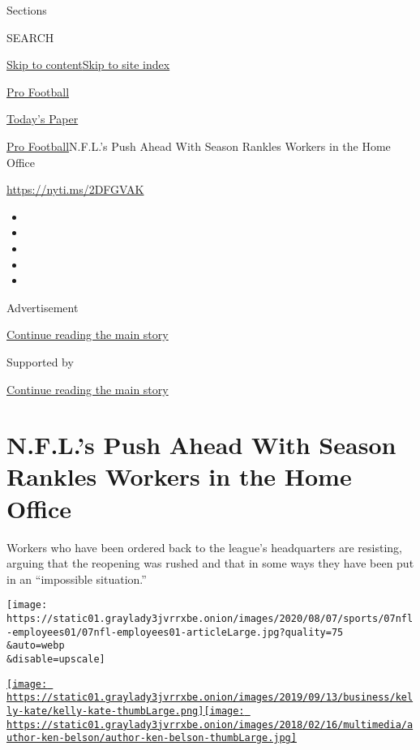 Sections

SEARCH

\protect\hyperlink{site-content}{Skip to
content}\protect\hyperlink{site-index}{Skip to site index}

\href{https://www.nytimes3xbfgragh.onion/section/sports/football}{Pro
Football}

\href{https://myaccount.nytimes3xbfgragh.onion/auth/login?response_type=cookie\&client_id=vi}{}

\href{https://www.nytimes3xbfgragh.onion/section/todayspaper}{Today's
Paper}

\href{/section/sports/football}{Pro Football}\textbar{}N.F.L.'s Push
Ahead With Season Rankles Workers in the Home Office

\url{https://nyti.ms/2DFGVAK}

\begin{itemize}
\item
\item
\item
\item
\item
\end{itemize}

Advertisement

\protect\hyperlink{after-top}{Continue reading the main story}

Supported by

\protect\hyperlink{after-sponsor}{Continue reading the main story}

\hypertarget{nfls-push-ahead-with-season-rankles-workers-in-the-home-office}{%
\section{N.F.L.'s Push Ahead With Season Rankles Workers in the Home
Office}\label{nfls-push-ahead-with-season-rankles-workers-in-the-home-office}}

Workers who have been ordered back to the league's headquarters are
resisting, arguing that the reopening was rushed and that in some ways
they have been put in an ``impossible situation.''

\texttt{[image: https://static01.graylady3jvrrxbe.onion/images/2020/08/07/sports/07nfl-employees01/07nfl-employees01-articleLarge.jpg?quality=75\\\&auto=webp\\\&disable=upscale]}

\href{https://www.nytimes3xbfgragh.onion/by/kate-kelly}{\texttt{[image: https://static01.graylady3jvrrxbe.onion/images/2019/09/13/business/kelly-kate/kelly-kate-thumbLarge.png]}}\href{https://www.nytimes3xbfgragh.onion/by/ken-belson}{\texttt{[image: https://static01.graylady3jvrrxbe.onion/images/2018/02/16/multimedia/author-ken-belson/author-ken-belson-thumbLarge.jpg]}}

